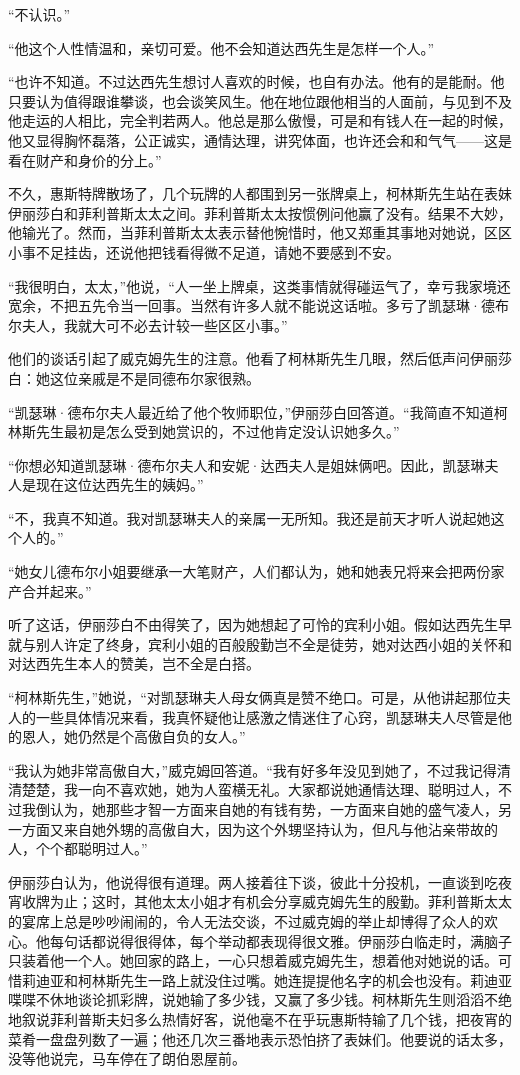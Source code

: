 \par “不认识。”
\par “他这个人性情温和，亲切可爱。他不会知道达西先生是怎样一个人。”
\par “也许不知道。不过达西先生想讨人喜欢的时候，也自有办法。他有的是能耐。他只要认为值得跟谁攀谈，也会谈笑风生。他在地位跟他相当的人面前，与见到不及他走运的人相比，完全判若两人。他总是那么傲慢，可是和有钱人在一起的时候，他又显得胸怀磊落，公正诚实，通情达理，讲究体面，也许还会和和气气——这是看在财产和身价的分上。”
\par 不久，惠斯特牌散场了，几个玩牌的人都围到另一张牌桌上，柯林斯先生站在表妹伊丽莎白和菲利普斯太太之间。菲利普斯太太按惯例问他赢了没有。结果不大妙，他输光了。然而，当菲利普斯太太表示替他惋惜时，他又郑重其事地对她说，区区小事不足挂齿，还说他把钱看得微不足道，请她不要感到不安。
\par “我很明白，太太，”他说，“人一坐上牌桌，这类事情就得碰运气了，幸亏我家境还宽余，不把五先令当一回事。当然有许多人就不能说这话啦。多亏了凯瑟琳·德布尔夫人，我就大可不必去计较一些区区小事。”
\par 他们的谈话引起了威克姆先生的注意。他看了柯林斯先生几眼，然后低声问伊丽莎白：她这位亲戚是不是同德布尔家很熟。
\par “凯瑟琳·德布尔夫人最近给了他个牧师职位，”伊丽莎白回答道。“我简直不知道柯林斯先生最初是怎么受到她赏识的，不过他肯定没认识她多久。”
\par “你想必知道凯瑟琳·德布尔夫人和安妮·达西夫人是姐妹俩吧。因此，凯瑟琳夫人是现在这位达西先生的姨妈。”
\par “不，我真不知道。我对凯瑟琳夫人的亲属一无所知。我还是前天才听人说起她这个人的。”
\par “她女儿德布尔小姐要继承一大笔财产，人们都认为，她和她表兄将来会把两份家产合并起来。”
\par 听了这话，伊丽莎白不由得笑了，因为她想起了可怜的宾利小姐。假如达西先生早就与别人许定了终身，宾利小姐的百般殷勤岂不全是徒劳，她对达西小姐的关怀和对达西先生本人的赞美，岂不全是白搭。
\par “柯林斯先生，”她说，“对凯瑟琳夫人母女俩真是赞不绝口。可是，从他讲起那位夫人的一些具体情况来看，我真怀疑他让感激之情迷住了心窍，凯瑟琳夫人尽管是他的恩人，她仍然是个高傲自负的女人。”
\par “我认为她非常高傲自大，”威克姆回答道。“我有好多年没见到她了，不过我记得清清楚楚，我一向不喜欢她，她为人蛮横无礼。大家都说她通情达理、聪明过人，不过我倒认为，她那些才智一方面来自她的有钱有势，一方面来自她的盛气凌人，另一方面又来自她外甥的高傲自大，因为这个外甥坚持认为，但凡与他沾亲带故的人，个个都聪明过人。”
\par 伊丽莎白认为，他说得很有道理。两人接着往下谈，彼此十分投机，一直谈到吃夜宵收牌为止；这时，其他太太小姐才有机会分享威克姆先生的殷勤。菲利普斯太太的宴席上总是吵吵闹闹的，令人无法交谈，不过威克姆的举止却博得了众人的欢心。他每句话都说得很得体，每个举动都表现得很文雅。伊丽莎白临走时，满脑子只装着他一个人。她回家的路上，一心只想着威克姆先生，想着他对她说的话。可惜莉迪亚和柯林斯先生一路上就没住过嘴。她连提提他名字的机会也没有。莉迪亚喋喋不休地谈论抓彩牌，说她输了多少钱，又赢了多少钱。柯林斯先生则滔滔不绝地叙说菲利普斯夫妇多么热情好客，说他毫不在乎玩惠斯特输了几个钱，把夜宵的菜肴一盘盘列数了一遍；他还几次三番地表示恐怕挤了表妹们。他要说的话太多，没等他说完，马车停在了朗伯恩屋前。


